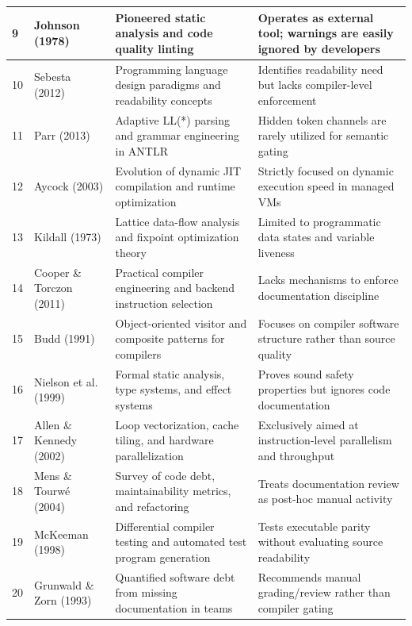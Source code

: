 \begin{longtable}{|p{0.6cm}|p{3.2cm}|p{5.4cm}|p{5.4cm}|}
9 & Johnson (1978) \cite{johnson1978lint} & Pioneered static analysis and code quality linting & Operates as external tool; warnings are easily ignored by developers \\ \hline

10 & Sebesta (2012) \cite{sebesta2012concepts} & Programming language design paradigms and readability concepts & Identifies readability need but lacks compiler-level enforcement \\ \hline

11 & Parr (2013) \cite{parr2013definitive} & Adaptive LL(*) parsing and grammar engineering in ANTLR & Hidden token channels are rarely utilized for semantic gating \\ \hline

12 & Aycock (2003) \cite{aycock2003brief} & Evolution of dynamic JIT compilation and runtime optimization & Strictly focused on dynamic execution speed in managed VMs \\ \hline

13 & Kildall (1973) \cite{kildall1973unified} & Lattice data-flow analysis and fixpoint optimization theory & Limited to programmatic data states and variable liveness \\ \hline

14 & Cooper \& Torczon (2011) \cite{cooper2011engineering} & Practical compiler engineering and backend instruction selection & Lacks mechanisms to enforce documentation discipline \\ \hline

15 & Budd (1991) \cite{budd1991object} & Object-oriented visitor and composite patterns for compilers & Focuses on compiler software structure rather than source quality \\ \hline

16 & Nielson et al. (1999) \cite{nielson1999principles} & Formal static analysis, type systems, and effect systems & Proves sound safety properties but ignores code documentation \\ \hline

17 & Allen \& Kennedy (2002) \cite{allen2002optimizing} & Loop vectorization, cache tiling, and hardware parallelization & Exclusively aimed at instruction-level parallelism and throughput \\ \hline

18 & Mens \& Tourwé (2004) \cite{mens2004survey} & Survey of code debt, maintainability metrics, and refactoring & Treats documentation review as post-hoc manual activity \\ \hline

19 & McKeeman (1998) \cite{mckeeman1998differential} & Differential compiler testing and automated test program generation & Tests executable parity without evaluating source readability \\ \hline

20 & Grunwald \& Zorn (1993) \cite{grunwald1993custom} & Quantified software debt from missing documentation in teams & Recommends manual grading/review rather than compiler gating \\ \hline

\end{longtable}


